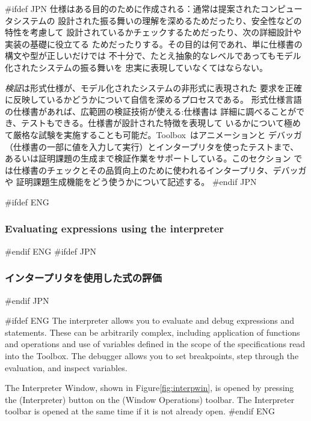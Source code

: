 \documentclass[\pformat,12pt]{article}
\newcommand{\Toolbox}{Toolbox}
\newcommand{\Toolbox}{Toolbox}
\newcommand{\guicmd}[1]{{\sf #1}}
\newcommand{\guicmd}[1]{{\gt #1}}
\begin{document}
#ifdef JPN
仕様はある目的のために作成される：通常は提案されたコンピュータシステムの
設計された振る舞いの理解を深めるためだったり、安全性などの特性を考慮して
設計されているかチェックするためだったり、次の詳細設計や実装の基礎に役立てる
ためだったりする。その目的は何であれ、単に仕様書の構文や型が正しいだけでは
不十分で、たとえ抽象的なレベルであってもモデル化されたシステムの振る舞いを
忠実に表現していなくてはならない。

{\em 検証\/}は形式仕様が、モデル化されたシステムの非形式に表現された
要求を正確に反映しているかどうかについて自信を深めるプロセスである。
形式仕様言語の仕様書があれば、広範囲の検証技術が使える:仕様書は
詳細に調べることができ、テストもできる。仕様書が設計された特徴を表現して
いるかについて極めて厳格な試験を実施することも可能だ。\Toolbox\ はアニメーションと
デバッガ（仕様書の一部に値を入力して実行）とインタープリタを使ったテストまで、
あるいは証明課題の生成まで検証作業をサポートしている。このセクション
では仕様書のチェックとその品質向上のために使われるインタープリタ、デバッガや
証明課題生成機能をどう使うかについて記述する。
#endif JPN

#ifdef ENG
\subsubsection{Evaluating expressions using the interpreter}
\label{interpreter}
#endif ENG
#ifdef JPN
\subsubsection{インタープリタを使用した式の評価}
\label{interpreter}
#endif JPN

#ifdef ENG
The interpreter allows you to evaluate and debug expressions and
statements.  These can be arbitrarily complex, including application
of functions and operations and use of variables defined in the scope
of the specifications read into the \Toolbox.  The debugger allows you
to set breakpoints, step through the evaluation, and inspect variables.

The \guicmd{Interpreter Window}, shown in
Figure\ref{fig:interpwin}, is opened by pressing the 
(\guicmd{Interpreter}) button on the (\guicmd{Window Operations})
toolbar. The \guicmd{Interpreter} toolbar is opened at the same
time if it is not already open.
#endif ENG
\end{document}
